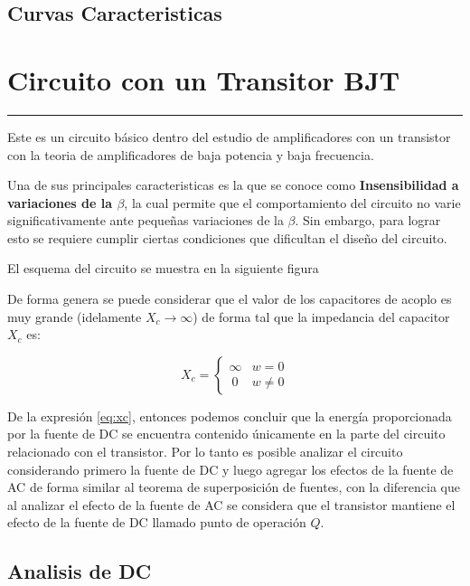 \documentclass{article}
\begin{document}
    \subsection{Curvas Caracteristicas}\label{curvas-caracteristicas}

    \section{Circuito con un Transitor
BJT}\label{circuito-con-un-transitor-bjt}

\begin{center}\rule{3in}{0.4pt}\end{center}

Este es un circuito básico dentro del estudio de amplificadores con un
transistor con la teoria de amplificadores de baja potencia y baja
frecuencia.

Una de sus principales caracteristicas es la que se conoce como
\textbf{Insensibilidad a variaciones de la $\beta$}, la cual permite que
el comportamiento del circuito no varie significativamente ante pequeñas
variaciones de la $\beta$. Sin embargo, para lograr esto se requiere
cumplir ciertas condiciones que dificultan el diseño del circuito.

El esquema del circuito se muestra en la siguiente figura

De forma genera se puede considerar que el valor de los capacitores de
acoplo es muy grande (idelamente $X_{c}\rightarrow\infty$) de forma tal
que la impedancia del capacitor $X_{c}$ es:

\begin{equation}\label{eq:xc}
X_{c}= \begin{cases}
\infty    & w=0 \\\
0 &  w \neq 0
\end{cases}
\end{equation}

De la expresión \eqref{eq:xc}, entonces podemos concluir que la energía
proporcionada por la fuente de DC se encuentra contenido únicamente en
la parte del circuito relacionado con el transistor. Por lo tanto es
posible analizar el circuito considerando primero la fuente de DC y
luego agregar los efectos de la fuente de AC de forma similar al teorema
de superposición de fuentes, con la diferencia que al analizar el efecto
de la fuente de AC se considera que el transistor mantiene el efecto de
la fuente de DC llamado punto de operación $Q$.

    \subsection{Analisis de DC}\label{analisis-de-dc}
\end{document}
